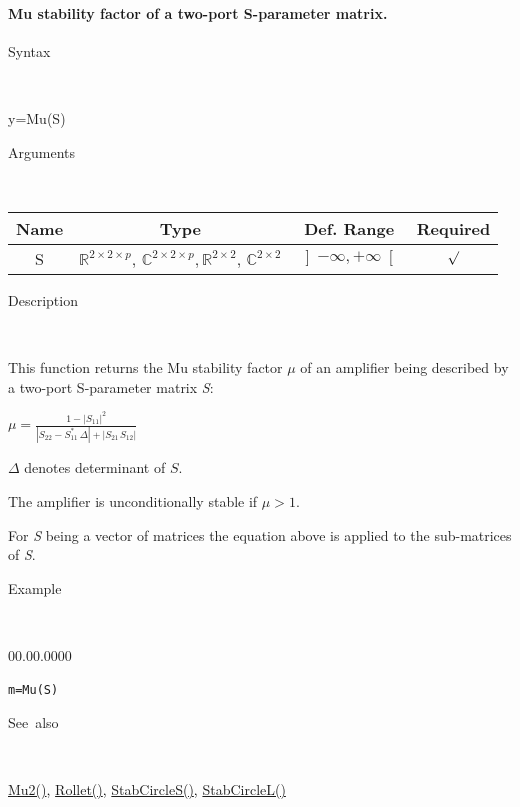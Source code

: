 \paragraph{\label{par:Mu-stability-factor}Mu stability factor of a two-port
S-parameter matrix.}

\begin{description}
\item [Syntax]~
\end{description}
y=Mu(S)

\begin{description}
\item [Arguments]~
\end{description}
\begin{tabular}{|c|c|c|c|}
\hline 
Name&
Type&
Def. Range&
Required\tabularnewline
\hline
\hline 
S&
$\mathbb{R}^{2\times2\times p}$, $\mathbb{C}^{2\times2\times p},$$\mathbb{R}^{2\times2}$,
$\mathbb{C}^{2\times2}$&
$\left]-\infty,+\infty\right[$&
$\surd$\tabularnewline
\hline
\end{tabular}

\begin{description}
\item [Description]~
\end{description}
This function returns the Mu stability factor $\mu$ of an amplifier
being described by a two-port S-parameter matrix \textit{S}:

\medskip{}
\noindent $\mu={\displaystyle \frac{1-\left|S_{11}\right|^{2}}{\left|S_{22}-S_{11}^{*}\,\Delta\right|+\left|S_{21\,}S_{12}\right|}}$
\medskip{}

$\Delta$ denotes determinant of $S$.

\noindent The amplifier is unconditionally stable if $\mu>1$.

\noindent For \textit{S} being a vector of matrices the equation above
is applied to the sub-matrices of \textit{S}.

\begin{description}
\item [Example]~
\end{description}
\begin{lyxlist}{00.00.0000}
\item [\texttt{m=Mu(S)}]~
\end{lyxlist}
\begin{description}
\item [See~also]~
\end{description}
\textcolor{blue}{\hyperlink{Mu2}{Mu2()}}\textcolor{black}{,} \textcolor{blue}{\hyperlink{Rollet}{Rollet()}}\textcolor{black}{,}
\textcolor{blue}{\hyperlink{StabCircleS}{StabCircleS()}}\textcolor{black}{,}
\textcolor{blue}{\hyperlink{StabCircleL}{StabCircleL()}}


